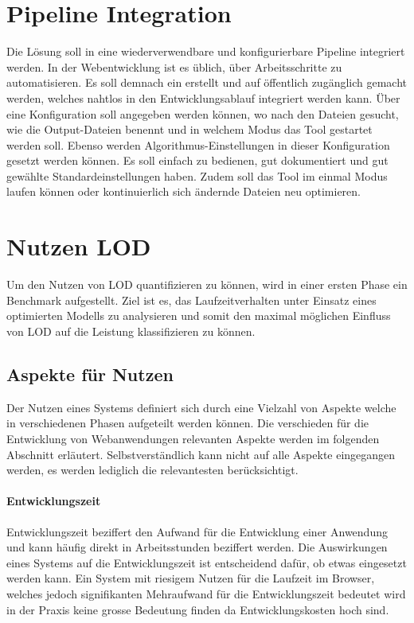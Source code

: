 \section{Pipeline Integration}
Die Lösung soll in eine wiederverwendbare und konfigurierbare Pipeline integriert werden.
In der Webentwicklung ist es üblich, über  Arbeitsschritte zu automatisieren. Es soll demnach ein  erstellt und auf  öffentlich zugänglich gemacht werden, welches nahtlos in den Entwicklungsablauf integriert werden kann. Über eine Konfiguration soll angegeben werden können, wo nach den  Dateien gesucht, wie die Output-Dateien benennt und in welchem Modus das Tool gestartet werden soll. Ebenso werden Algorithmus-Einstellungen in dieser Konfiguration gesetzt werden können. Es soll einfach zu bedienen, gut dokumentiert und gut gewählte Standardeinstellungen haben. Zudem soll das Tool im einmal Modus laufen können oder kontinuierlich sich ändernde Dateien neu optimieren.

\section{Nutzen LOD}
Um den Nutzen von LOD quantifizieren zu können, wird in einer ersten Phase ein Benchmark aufgestellt.
Ziel ist es, das Laufzeitverhalten unter Einsatz eines optimierten Modells zu analysieren und somit den maximal möglichen Einfluss von LOD auf die Leistung klassifizieren zu können.

\subsection{Aspekte für Nutzen}

Der Nutzen eines Systems definiert sich durch eine Vielzahl von Aspekte welche in verschiedenen Phasen aufgeteilt werden können. Die verschieden für die Entwicklung von Webanwendungen relevanten Aspekte werden im folgenden Abschnitt erläutert. Selbstverständlich kann nicht auf alle Aspekte eingegangen werden, es werden lediglich die relevantesten berücksichtigt.

\paragraph{Entwicklungszeit}

Entwicklungszeit beziffert den Aufwand für die Entwicklung einer Anwendung und kann häufig direkt in Arbeitsstunden beziffert werden.
Die Auswirkungen eines Systems auf die Entwicklungszeit ist entscheidend dafür, ob etwas eingesetzt werden kann. Ein System mit riesigem Nutzen für die Laufzeit im Browser, welches jedoch signifikanten Mehraufwand für die Entwicklungszeit bedeutet wird in der Praxis keine grosse Bedeutung finden da Entwicklungskosten hoch sind.

